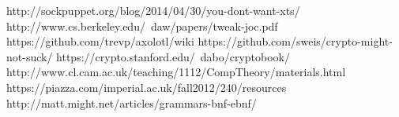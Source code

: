 
http://sockpuppet.org/blog/2014/04/30/you-dont-want-xts/
http://www.cs.berkeley.edu/~daw/papers/tweak-joc.pdf
https://github.com/trevp/axolotl/wiki
https://github.com/sweis/crypto-might-not-suck/
https://crypto.stanford.edu/~dabo/cryptobook/
http://www.cl.cam.ac.uk/teaching/1112/CompTheory/materials.html
https://piazza.com/imperial.ac.uk/fall2012/240/resources
http://matt.might.net/articles/grammars-bnf-ebnf/
